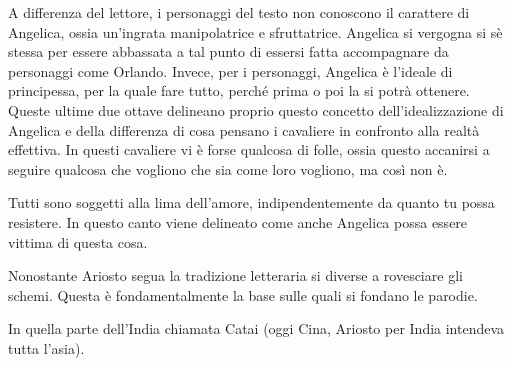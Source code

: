 \documentclass[a4paper]{article}
\begin{document}
A differenza del lettore, i personaggi del testo non conoscono il carattere di Angelica,
ossia un'ingrata manipolatrice e sfruttatrice.
Angelica si vergogna si sè stessa per essere abbassata a tal punto di essersi fatta accompagnare
da personaggi come Orlando.
Invece, per i personaggi, Angelica è l'ideale di principessa, per la quale fare tutto,
perché prima o poi la si potrà ottenere.
Queste ultime due ottave delineano proprio questo concetto dell'idealizzazione di Angelica
e della differenza di cosa pensano i cavaliere in confronto alla realtà effettiva.
In questi cavaliere vi è forse qualcosa di folle, ossia questo accanirsi a seguire qualcosa
che vogliono che sia come loro vogliono, ma così non è.

Tutti sono soggetti alla lima dell'amore, indipendentemente da quanto tu possa resistere.
In questo canto viene delineato come anche Angelica possa essere vittima di questa cosa.

Nonostante Ariosto segua la tradizione letteraria si diverse a rovesciare gli schemi.
Questa è fondamentalmente la base sulle quali si fondano le parodie.

\begin{center} %
\begin{minipage}{0.5\textwidth}
\centering
{}
\end{minipage}
\end{center}

In quella parte dell'India chiamata Catai (oggi Cina, Ariosto per India intendeva tutta l'asia).

\end{document}
